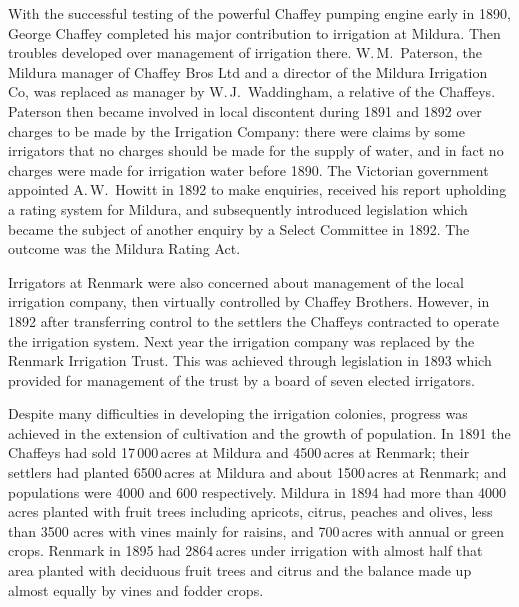 With the successful testing of the powerful Chaffey pumping engine
early in 1890, George Chaffey completed his major contribution to
irrigation at Mildura.  Then troubles developed over management of
irrigation there.  W.\,M.~Paterson,  the Mildura
manager of Chaffey Bros Ltd and a director of the Mildura Irrigation
Co, was replaced as manager by W.\,J.~Waddingham,  a relative of the Chaffeys.  Paterson then became involved in
local discontent during 1891 and 1892 over charges to be made by the
Irrigation Company: there were claims by some irrigators that no
charges should be made for the supply of water, and in fact no charges
were made for irrigation water before 1890.  The Victorian government
appointed A.\,W.~Howitt  in 1892 to make
enquiries, received his report upholding a rating system for Mildura,
and subsequently introduced legislation which became the subject of
another enquiry by a Select Committee in 1892.  The outcome was the
Mildura Rating Act.

Irrigators at Renmark were also concerned about management of the
local irrigation company, then virtually controlled by Chaffey
Brothers.  However, in 1892 after transferring control to the settlers
the Chaffeys contracted to operate the irrigation system.  Next year
the irrigation company was replaced by the Renmark Irrigation
Trust.  This was achieved through
legislation in 1893 which provided for management of the trust by a
board of seven elected irrigators.

Despite many difficulties in developing the irrigation colonies,
prog\-ress was achieved in the extension of cultivation and the growth
of population.  In 1891 the Chaffeys had sold 17\,000\,acres at
Mildura and 4500\,acres at Renmark; their settlers had planted
6500\,acres at Mildura and about 1500\,acres at Renmark; and
populations were 4000 and 600 respectively.  Mildura in 1894 had more
than 4000\,acres planted with fruit trees including
apricots, citrus, peaches and olives, less than 3500 acres with
vines mainly for raisins, and 700\,acres with annual
or green crops.  Renmark in 1895 had 2864\,acres under irrigation with
almost half that area planted with deciduous fruit trees and citrus
and the balance made up almost equally by vines and
fodder crops.

